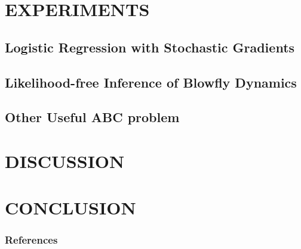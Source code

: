 \documentclass[]{article}
\begin{document}
\section{EXPERIMENTS} \label{experiments}

\subsection{Logistic Regression with Stochastic Gradients}

\subsection{Likelihood-free Inference of Blowfly Dynamics}

\subsection{Other Useful ABC problem}

\section{DISCUSSION} \label{discussion}

\section{CONCLUSION} \label{conclusion}

\subsubsection*{References}
\newpage
{

}
\end{document}
